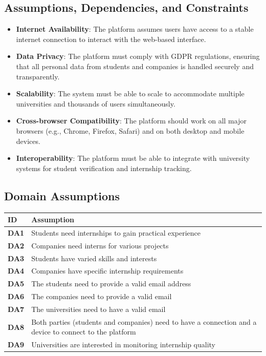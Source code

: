 \subsection{Assumptions, Dependencies, and Constraints}
\begin{itemize}
    \item \textbf{Internet Availability}: The platform assumes users have access to a stable internet connection to interact with the web-based interface.
    \item \textbf{Data Privacy}: The platform must comply with GDPR regulations, ensuring that all personal data from students and companies is handled securely and transparently.
    \item \textbf{Scalability}: The system must be able to scale to accommodate multiple universities and thousands of users simultaneously.
    \item \textbf{Cross-browser Compatibility}: The platform should work on all major browsers (e.g., Chrome, Firefox, Safari) and on both desktop and mobile devices.
    \item \textbf{Interoperability}: The platform must be able to integrate with university systems for student verification and internship tracking.
\end{itemize}

\subsection{Domain Assumptions}
\begin{longtable}{|p{1cm}|p{4cm}|}
\hline
\textbf{ID} & \textbf{Assumption} \\
\hline
\textbf{DA1} & Students need internships to gain practical experience \\
\hline
\textbf{DA2} & Companies need interns for various projects \\
\hline
\textbf{DA3} & Students have varied skills and interests \\
\hline
\textbf{DA4} & Companies have specific internship requirements \\
\hline
\textbf{DA5} & The students need to provide a valid email address \\
\hline
\textbf{DA6} & The companies need to provide a valid email \\
\hline
\textbf{DA7} & The universities need to have a valid email \\
\hline
\textbf{DA8} & Both parties (students and companies) need to have a connection and a device to connect to the platform \\
\hline
\textbf{DA9} & Universities are interested in monitoring internship quality \\
\hline
\end{longtable}
\newpage